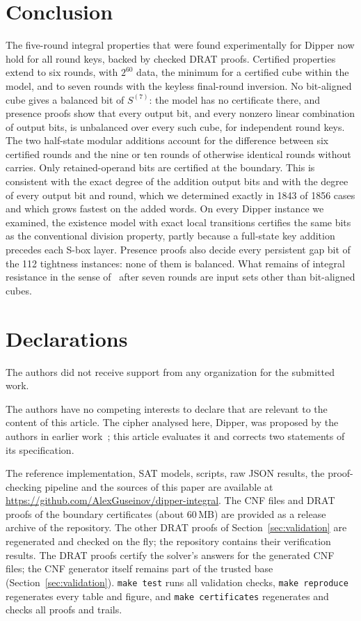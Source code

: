 \documentclass[pdflatex,sn-mathphys-num]{sn-jnl}
\theoremstyle{thmstyleone}
\theoremstyle{thmstylethree}
\theoremstyle{thmstyletwo}
\newcommand{\repo}{\url{https://github.com/AlexGuseinov/dipper-integral}}
\begin{document}
\section{Conclusion}
The five-round integral properties that were found experimentally for Dipper now hold for all round keys, backed by checked DRAT proofs. Certified properties extend to six rounds, with $2^{60}$ data, the minimum for a certified cube within the model, and to seven rounds with the keyless final-round inversion. No bit-aligned cube gives a balanced bit of $S^{(7)}$: the model has no certificate there, and presence proofs show that every output bit, and every nonzero linear combination of output bits, is unbalanced over every such cube, for independent round keys. The two half-state modular additions account for the difference between six certified rounds and the nine or ten rounds of otherwise identical rounds without carries. Only retained-operand bits are certified at the boundary. This is consistent with the exact degree of the addition output bits and with the degree of every output bit and round, which we determined exactly in 1843 of 1856 cases and which grows fastest on the added words. On every Dipper instance we examined, the existence model with exact local transitions certifies the same bits as the conventional division property, partly because a full-state key addition precedes each S-box layer. Presence proofs also decide every persistent gap bit of the 112 tightness instances: none of them is balanced. What remains of integral resistance in the sense of~\cite{hebborn2021} after seven rounds are input sets other than bit-aligned cubes.


\backmatter

\section*{Declarations}

The authors did not receive support from any organization for the submitted work.

The authors have no competing interests to declare that are relevant to the content of this article. The cipher analysed here, Dipper, was proposed by the authors in earlier work~\cite{dipper2026}; this article evaluates it and corrects two statements of its specification.

The reference implementation, SAT models, scripts, raw JSON results, the proof-checking pipeline and the sources of this paper are available at \repo{}. The CNF files and DRAT proofs of the boundary certificates (about 60\,MB) are provided as a release archive of the repository. The other DRAT proofs of Section~\ref{sec:validation} are regenerated and checked on the fly; the repository contains their verification results. The DRAT proofs certify the solver's answers for the generated CNF files; the CNF generator itself remains part of the trusted base (Section~\ref{sec:validation}). \texttt{make test} runs all validation checks, \texttt{make reproduce} regenerates every table and figure, and \texttt{make certificates} regenerates and checks all proofs and trails.
\end{document}
